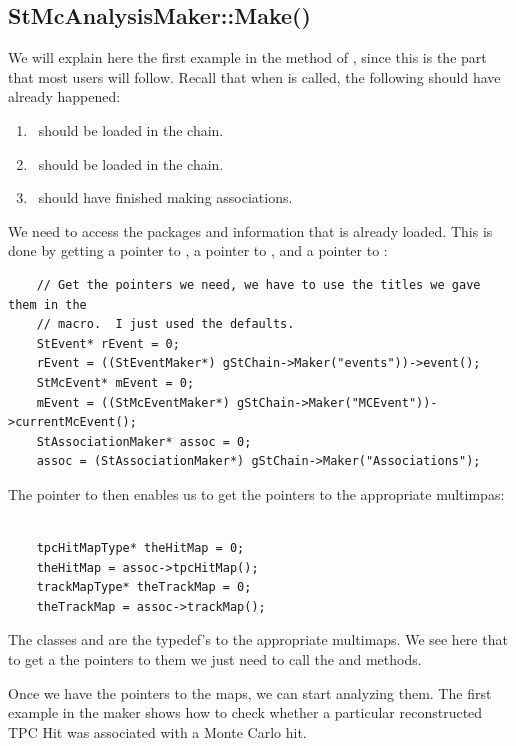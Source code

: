 \subsection{StMcAnalysisMaker::Make()}
We will explain here the first example in
the  method of , since this is the
part that most users will follow.
Recall that when  is called, the following should have already
happened:
\begin{enumerate}
\item \StEvent\ should be loaded in the chain.
\item \StMcEvent\ should be loaded in the chain.
\item \StAssociationMaker\ should have finished making associations.
\end{enumerate}

We need to access the packages and information that is already loaded.  This is done
by getting a pointer to , a pointer to , and a pointer
to :

\begin{verbatim}
    // Get the pointers we need, we have to use the titles we gave them in the
    // macro.  I just used the defaults.
    StEvent* rEvent = 0;
    rEvent = ((StEventMaker*) gStChain->Maker("events"))->event();
    StMcEvent* mEvent = 0;
    mEvent = ((StMcEventMaker*) gStChain->Maker("MCEvent"))->currentMcEvent();
    StAssociationMaker* assoc = 0;
    assoc = (StAssociationMaker*) gStChain->Maker("Associations");
\end{verbatim}

The pointer to  then enables us to get the pointers to the
appropriate multimpas:

\begin{verbatim}

    tpcHitMapType* theHitMap = 0;
    theHitMap = assoc->tpcHitMap();
    trackMapType* theTrackMap = 0;
    theTrackMap = assoc->trackMap();

\end{verbatim}

The classes  and  are the typedef's to the
appropriate multimaps.    
We see here that to get a the pointers to them we just need to call
the  and  methods.

Once we have the pointers to the maps, we can start analyzing them.  The first example
in the maker shows how to check whether a particular reconstructed TPC Hit was associated
with a Monte Carlo hit. 

